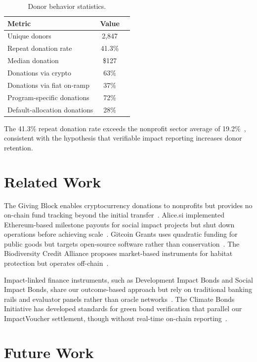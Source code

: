 \documentclass[11pt,letterpaper]{article}
\begin{document}
\begin{table}[t]
\centering
\begin{tabular}{lcc}
\toprule
\textbf{Metric} & \textbf{Value} \\
\midrule
Unique donors & 2{,}847 \\
Repeat donation rate & 41.3\% \\
Median donation & \$127 \\
Donations via crypto & 63\% \\
Donations via fiat on-ramp & 37\% \\
Program-specific donations & 72\% \\
Default-allocation donations & 28\% \\
\bottomrule
\end{tabular}
\caption{Donor behavior statistics.}
\label{tab:donors}
\end{table}

The 41.3\% repeat donation rate exceeds the nonprofit sector average of 19.2\%~\cite{fundraisingreport2024}, consistent with the hypothesis that verifiable impact reporting increases donor retention.

\section{Related Work}

The Giving Block enables cryptocurrency donations to nonprofits but provides no on-chain fund tracking beyond the initial transfer~\cite{givingblock2022}. Alice.si implemented Ethereum-based milestone payouts for social impact projects but shut down operations before achieving scale~\cite{alice2019}. Gitcoin Grants uses quadratic funding for public goods but targets open-source software rather than conservation~\cite{gitcoin2023}. The Biodiversity Credit Alliance proposes market-based instruments for habitat protection but operates off-chain~\cite{bca2023}.

Impact-linked finance instruments, such as Development Impact Bonds and Social Impact Bonds, share our outcome-based approach but rely on traditional banking rails and evaluator panels rather than oracle networks~\cite{gustafsson2019}. The Climate Bonds Initiative has developed standards for green bond verification that parallel our ImpactVoucher settlement, though without real-time on-chain reporting~\cite{climatebonds2023}.

\section{Future Work}
\end{document}
